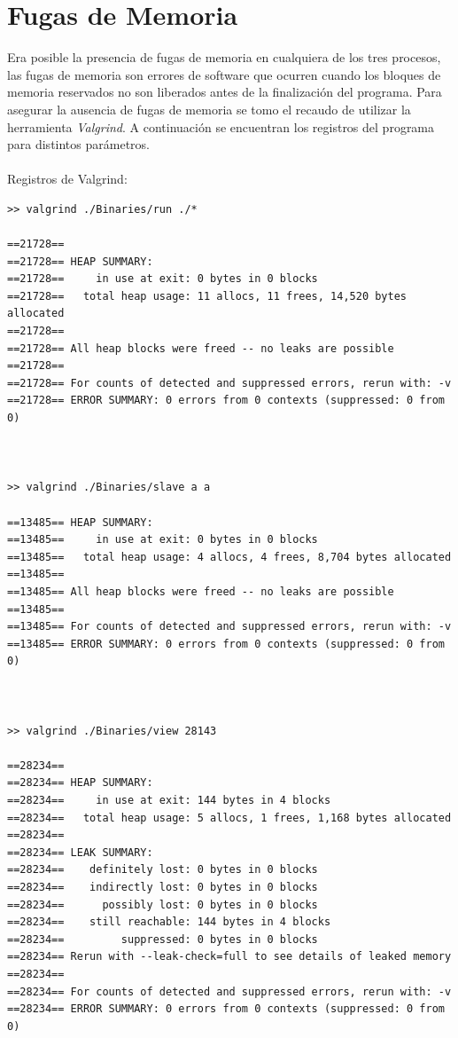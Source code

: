 \documentclass[10pt,a4paper]{report}
\begin{document}
\section{Fugas de Memoria}
Era posible la presencia de fugas de memoria en cualquiera de los tres procesos, las fugas de memoria
son errores de software que ocurren cuando los bloques de memoria reservados no son liberados antes de la finalización del programa.
Para asegurar la ausencia de fugas de memoria se tomo el recaudo de utilizar la herramienta \textit{Valgrind}. A continuación se encuentran
los registros del programa para distintos parámetros.
\\\\ Registros de Valgrind:
\begin{lstlisting}
>> valgrind ./Binaries/run ./*

==21728== 
==21728== HEAP SUMMARY:
==21728==     in use at exit: 0 bytes in 0 blocks
==21728==   total heap usage: 11 allocs, 11 frees, 14,520 bytes allocated
==21728== 
==21728== All heap blocks were freed -- no leaks are possible
==21728== 
==21728== For counts of detected and suppressed errors, rerun with: -v
==21728== ERROR SUMMARY: 0 errors from 0 contexts (suppressed: 0 from 0)



>> valgrind ./Binaries/slave a a

==13485== HEAP SUMMARY:
==13485==     in use at exit: 0 bytes in 0 blocks
==13485==   total heap usage: 4 allocs, 4 frees, 8,704 bytes allocated
==13485== 
==13485== All heap blocks were freed -- no leaks are possible
==13485== 
==13485== For counts of detected and suppressed errors, rerun with: -v
==13485== ERROR SUMMARY: 0 errors from 0 contexts (suppressed: 0 from 0)



>> valgrind ./Binaries/view 28143

==28234== 
==28234== HEAP SUMMARY:
==28234==     in use at exit: 144 bytes in 4 blocks
==28234==   total heap usage: 5 allocs, 1 frees, 1,168 bytes allocated
==28234== 
==28234== LEAK SUMMARY:
==28234==    definitely lost: 0 bytes in 0 blocks
==28234==    indirectly lost: 0 bytes in 0 blocks
==28234==      possibly lost: 0 bytes in 0 blocks
==28234==    still reachable: 144 bytes in 4 blocks
==28234==         suppressed: 0 bytes in 0 blocks
==28234== Rerun with --leak-check=full to see details of leaked memory
==28234== 
==28234== For counts of detected and suppressed errors, rerun with: -v
==28234== ERROR SUMMARY: 0 errors from 0 contexts (suppressed: 0 from 0)
\end{lstlisting}
\end{document}
